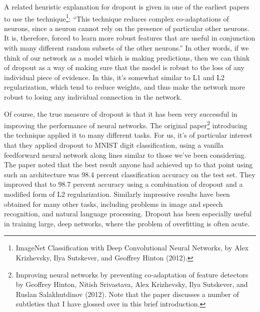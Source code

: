 \documentclass[a4paper,twoside,10pt]{book}
\begin{document}
A related heuristic explanation for dropout is given in one of the earliest papers to use the technique\footnote{ImageNet Classification with Deep Convolutional Neural Networks, by Alex Krizhevsky, Ilya Sutskever, and Geoffrey Hinton (2012).}: ``This technique reduces complex co-adaptations of neurons, since a neuron cannot rely on the presence of particular other neurons. It is, therefore, forced to learn more robust features that are useful in conjunction with many different random subsets of the other neurons.'' In other words, if we think of our network as a model which is making predictions, then we can think of dropout as a way of making sure that the model is robust to the loss of any individual piece of evidence. In this, it's somewhat similar to L1 and L2 regularization, which tend to reduce weights, and thus make the network more robust to losing any individual connection in the network.

Of course, the true measure of dropout is that it has been very successful in improving the performance of neural networks. The original paper\footnote{Improving neural networks by preventing co-adaptation of feature detectors by Geoffrey Hinton, Nitish Srivastava, Alex Krizhevsky, Ilya Sutskever, and Ruslan Salakhutdinov (2012). Note that the paper discusses a number of subtleties that I have glossed over in this brief introduction.} introducing the technique applied it to many different tasks. For us, it's of particular interest that they applied dropout to MNIST digit classification, using a vanilla feedforward neural network along lines similar to those we've been considering. The paper noted that the best result anyone had achieved up to that point using such an architecture was 98.4 percent classification accuracy on the test set. They improved that to 98.7 percent accuracy using a combination of dropout and a modified form of L2 regularization. Similarly impressive results have been obtained for many other tasks, including problems in image and speech recognition, and natural language processing. Dropout has been especially useful in training large, deep networks, where the problem of overfitting is often acute.
\end{document}
